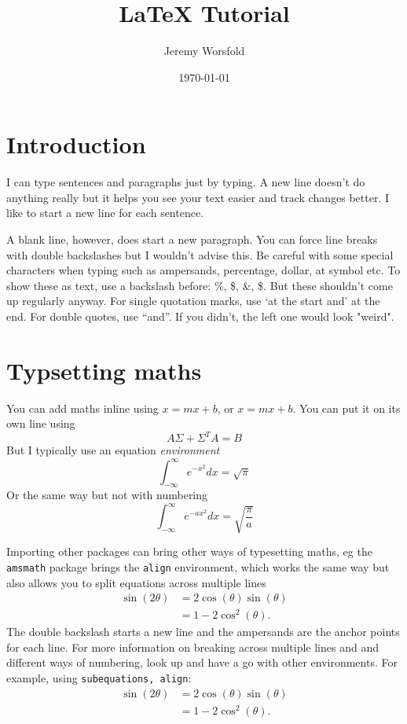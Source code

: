 \documentclass{article}
\title{LaTeX Tutorial}
\author{Jeremy Worsfold}
\date{\today}
\begin{document}
\maketitle

\section{Introduction}

I can type sentences and paragraphs just by typing.
A new line doesn't do anything really but it helps you see your text easier and track changes better.
I like to start a new line for each sentence.

A blank line, however, does start a new paragraph. You can force line breaks with double backslashes but I wouldn't advise this. 
Be careful with some special characters when typing such as ampersands, percentage, dollar, at symbol etc. To show these as text, use a backslash before: \%, \$, \&, \$. But these shouldn't come up regularly anyway.
For single quotation marks, use `at the start and' at the end. For double quotes, use ``and''. 
If you didn't, the left one would look "weird".


\section{Typsetting maths}

You can add maths inline using $x=mx + b$, or \(x=mx+b\). You can put it on its own line using 
\[
    A\Sigma + \Sigma^T A = B
\]
But I typically use an equation \textit{environment}
\begin{equation}
    \int_{-\infty}^\infty e^{-x^2} d x = \sqrt{\pi}
\end{equation}
Or the same way but not with numbering
\begin{equation*}
    \int_{-\infty}^\infty e^{-ax^2} d x = \sqrt{\frac{\pi}{a}}
\end{equation*}

Importing other packages can bring other ways of typesetting maths, eg the \texttt{amsmath} package brings the \texttt{align} environment, which works the same way but also allows you to split equations across multiple lines
\begin{align}
    \sin(2\theta) & = 2\cos(\theta)\sin(\theta) \\
    & = 1-2\cos^2(\theta).
\end{align}
The double backslash starts a new line and the ampersands are the anchor points for each line.
For more information on breaking across multiple lines and and different ways of numbering, look up and have a go with other environments.
For example, using \texttt{subequations, align}:
\begin{subequations} %
\begin{align} %
    \sin(2\theta) & = 2\cos(\theta)\sin(\theta) \\
    & = 1-2\cos^2(\theta).
\end{align}
\end{subequations}
\end{document}
